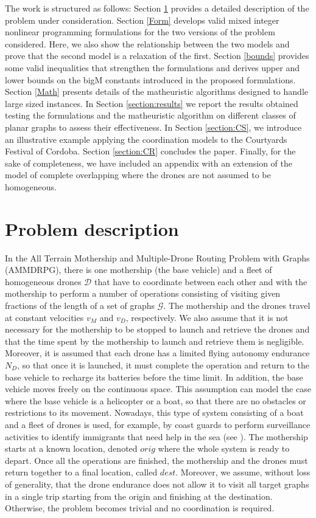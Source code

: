 \documentclass[10pt,a4paper]{elsarticle}
\def\AMD{{\sf AMMDRPG\xspace}}
\newcommand{\EN}[1]{{\color{black}#1}}
\begin{document}
\noindent
The work is structured as follows: Section \ref{section:desc} provides a detailed description of the problem under consideration. Section \ref{Form}  develops valid mixed integer nonlinear programming formulations for the two versions of the \EN{problem considered}. Here, we also show the relationship between the two models and prove that the second model is a relaxation of the first. Section \ref{bounds} provides some valid inequalities that strengthen the formulations and derives upper and lower bounds on the bigM constants introduced in the proposed formulations. Section \ref{Math} presents details of the matheuristic algorithms designed to handle large sized instances. In Section \ref{section:results} we report the results obtained testing the formulations and the matheuristic algorithm on different classes of planar graphs to assess \EN{their} effectiveness. In Section \ref{section:CS}, we introduce an illustrative example applying the coordination models to the Courtyards Festival of Cordoba. Section \ref{section:CR} concludes the paper. Finally, for the sake of completeness, we have included an appendix with an extension of the model of complete overlapping where the drones are not assumed to be homogeneous. 
\section{Problem description}\label{section:desc}
\noindent
In the All Terrain Mothership and \EN{Multiple-Drone} Routing Problem with Graphs (\AMD), there is one mothership (the base vehicle) and a fleet of homogeneous drones $\mathcal D$ that have to coordinate \EN{between each other} and with the mothership to perform a number of operations consisting \EN{of} visiting given fractions of the length of a set of graphs $\mathcal G$. The mothership and the drones travel at constant velocities $v_M$ and $v_D$, respectively. We also assume that \EN{it} is not \EN{necessary for} the mothership to be stopped to launch and retrieve the drones and that the time spent by the mothership to launch and retrieve them is negligible. Moreover, it is assumed that each drone has a limited flying autonomy endurance $N_D$, so that once it is launched, it must complete the operation and return to the base vehicle to recharge \EN{its} batteries before the time limit. In addition, the base vehicle moves freely on the continuous space. This assumption can model the case where the base vehicle is a helicopter or a boat, so that there are no obstacles or restrictions \EN{to} its movement. Nowadays, this type of system consisting \EN{of} a boat and a fleet of drones \EN{is} used, for example, by coast guards to perform surveillance activities to identify immigrants that need help in the sea (see \cite{altigator2015}). The mothership starts at a known location, denoted $orig$ where the whole system is ready to depart. Once all the operations are finished, the mothership and the drones must return together to a final location, called $dest$. Moreover, we assume, without loss of generality, that the drone endurance does not allow \EN{it} to visit all target graphs in a single trip starting from the origin and finishing at the destination. Otherwise, the problem becomes trivial and no coordination is required.
\end{document}
